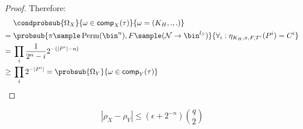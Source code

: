 \documentclass[eprint.tex]{subfiles}
\begin{document}
\begin{proof}
    Therefore:
    \begin{align*}
        {}&\condprobsub{\Omega_X}{\omega \in \comp_X(\tau)}{\omega = (K_H, ., .)} \\
        ={}& \probsub{
            \pi \sample \Perm(\bin^n),
            F \sample (\mathcal{N} \rightarrow \bin^{l_S})
        }{
            \forall_i : \eta_{K_H, \pi, F, T^i}(P^i) = C^i
        } \\
        ={}& \prod_i \frac{1}{2^n - i}2^{-(|P^i| - n)} \\
        \geq {}& \prod_i 2^{-|P^i|} = \probsub{\Omega_Y}{\omega \in \comp_Y(\tau)} \qedhere \\
    \end{align*}
\end{proof}

\begin{lemma} \label{xyadv}
    \begin{displaymath}
        |\rho_X - \rho_Y|
        \leq (\epsilon + 2^{-n})\binom{q}{2}
    \end{displaymath}
\end{lemma}
\end{document}
